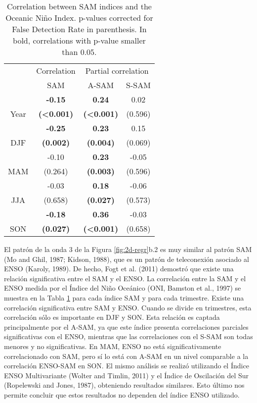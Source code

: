 \documentclass[12pt,oneside]{reedthesis}
\begin{document}
\begin{table}

\caption{\label{tab:enso-cor-table}Correlation between SAM indices and the Oceanic Niño Index. p-values corrected for False Detection Rate in parenthesis. In bold, correlations with p-value smaller than 0.05.}
\centering
\begin{tabular}[t]{c>{}c>{}c>{}c}
\toprule
\multicolumn{1}{c}{ } & \multicolumn{1}{c}{Correlation} & \multicolumn{2}{c}{Partial correlation} \\
\cmidrule(l{3pt}r{3pt}){2-2} \cmidrule(l{3pt}r{3pt}){3-4}
 & SAM & A-SAM & S-SAM\\
\midrule
 & \textbf{-0.15} & \textbf{0.24} & 0.02\\
\cmidrule{2-4}
\multirow[t]{-2}{*}{\centering\arraybackslash Year} & \textbf{(<0.001)} & \textbf{(<0.001)} & (0.596)\\
\cmidrule{1-4}
 & \textbf{-0.25} & \textbf{0.23} & 0.15\\
\cmidrule{2-4}
\multirow[t]{-2}{*}{\centering\arraybackslash DJF} & \textbf{(0.002)} & \textbf{(0.004)} & (0.069)\\
\cmidrule{1-4}
 & -0.10 & \textbf{0.23} & -0.05\\
\cmidrule{2-4}
\multirow[t]{-2}{*}{\centering\arraybackslash MAM} & (0.264) & \textbf{(0.003)} & (0.596)\\
\cmidrule{1-4}
 & -0.03 & \textbf{0.18} & -0.06\\
\cmidrule{2-4}
\multirow[t]{-2}{*}{\centering\arraybackslash JJA} & (0.658) & \textbf{(0.027)} & (0.573)\\
\cmidrule{1-4}
 & \textbf{-0.18} & \textbf{0.36} & -0.03\\
\cmidrule{2-4}
\multirow[t]{-2}{*}{\centering\arraybackslash SON} & \textbf{(0.027)} & \textbf{(<0.001)} & (0.658)\\
\bottomrule
\end{tabular}
\end{table}
El patrón de la onda 3 de la Figura \ref{fig:2d-regr}b.2 es muy similar al patrón SAM (Mo and Ghil, 1987; Kidson, 1988), que es un patrón de teleconexión asociado al ENSO (Karoly, 1989).
De hecho, Fogt et al. (2011) demostró que existe una relación significativa entre el SAM y el ENSO.
La correlación entre la SAM y el ENSO medida por el Índice del Niño Oceánico (ONI, Bamston et al., 1997) se muestra en la Tabla \ref{tab:enso-cor-table} para cada índice SAM y para cada trimestre.
Existe una correlación significativa entre SAM y ENSO. Cuando se divide en trimestres, esta correlación sólo es importante en DJF y SON.
Esta relación es captada principalmente por el A\nobreakdash-SAM, ya que este índice presenta correlaciones parciales significativas con el ENSO, mientras que las correlaciones con el S\nobreakdash-SAM son todas menores y no significativas.
En MAM, ENSO no está significativamente correlacionado con SAM, pero sí lo está con A\nobreakdash-SAM en un nivel comparable a la correlación ENSO-SAM en SON. El mismo análisis se realizó utilizando el Índice ENSO Multivariante (Wolter and Timlin, 2011) y el Índice de Oscilación del Sur (Ropelewski and Jones, 1987), obteniendo resultados similares.
Esto último nos permite concluir que estos resultados no dependen del índice ENSO utilizado.
\end{document}
